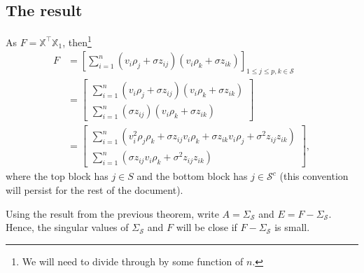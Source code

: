 \documentclass[11pt]{article}
\newcommand{\X}{\mathbb{X}}
\renewcommand{\S}{\mathcal{S}}
\begin{document}
\subsection{The result}
As $ F = \X^{\top}\X_1$, then\footnote{We will need to divide through by some function of $n$.}
\begin{align}
F & = \left[\sum_{i=1}^n(v_i\rho_j + \sigma z_{ij})(v_i\rho_k + \sigma z_{ik})\right]_{1\leq j\leq p, k \in \S} \\
& = 
\begin{bmatrix}
\sum_{i=1}^n(v_i\rho_j + \sigma z_{ij})(v_i\rho_k + \sigma z_{ik})\\
\sum_{i=1}^n(\sigma z_{ij})(v_i\rho_k + \sigma z_{ik})
\end{bmatrix} \\
& 
=
\begin{bmatrix}
\sum_{i=1}^n(v_i^2\rho_j\rho_k + \sigma z_{ij}v_i\rho_k + \sigma z_{ik}v_i\rho_j +  \sigma^2 z_{ij}z_{ik})\\
\sum_{i=1}^n( \sigma z_{ij}v_i\rho_k +  \sigma^2 z_{ij}z_{ik})
\end{bmatrix},
\end{align}
where the top block has $j \in S$ and the bottom block has $j \in \S^c$ (this convention will persist for the rest of the document).

Using the result from the previous theorem, write $A = \Sigma_\S$ and $E = F - \Sigma_\S$.  Hence, the singular values of $\Sigma_\S$  and $F$ will be close if $F - \Sigma_\S$ is small.
\end{document}
